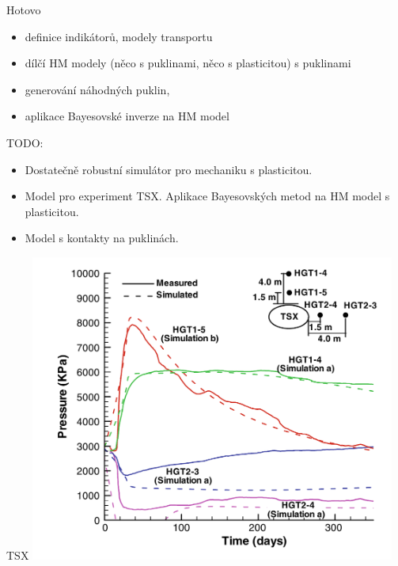 \documentclass[10pt,xcolor={usenames,dvipsnames}]{beamer} %
\begin{document}
\begin{frame}{Hotovo}
 \begin{itemize}
  \item definice indikátorů, modely transportu
  \item dílčí HM modely (něco s puklinami, něco s plasticitou) s puklinami
  \item generování náhodných puklin, 
  \item aplikace Bayesovské inverze na HM model
 \end{itemize}
 
 TODO:
 \begin{itemize}
  \item Dostatečně robustní simulátor pro mechaniku s plasticitou.
  \item Model pro experiment TSX. Aplikace Bayesovských metod na HM model s plasticitou.
  \item Model s kontakty na puklinách.
 \end{itemize}

\end{frame}

\begin{frame}{TSX}
 \includegraphics[width=0.9\textwidth]{graphics/TSX_measurement.png}
\end{frame}
\end{document}
